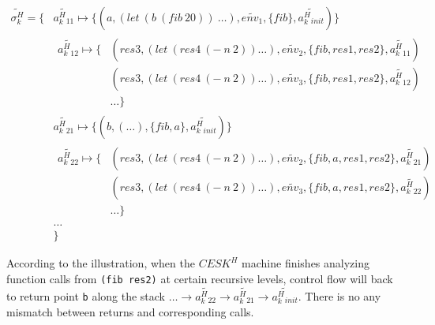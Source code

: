 \documentclass{article}
\begin{document}
\[
\begin{aligned}
\widetilde{\sigma_k^H} = \{ {}& \widetilde{a^H_k{}_{11}} \mapsto \{(a, (let\ (b\ (fib\ 20))\ \dots), \widetilde{env_1}, \{fib\}, \widetilde{a^H_k{}_{init}})\}  {} \\
                            &
                            \begin{aligned}
                              \widetilde{a^H_k{}_{12}} \mapsto
                              \{{}& (res3, (let\ (res4\ (-\ n\ 2)) \dots), \widetilde{env_2}, \{fib, res1, res2\}, \widetilde{a^H_k{}_{11}}) {}\\
                              & (res3, (let\ (res4\ (-\ n\ 2)) \dots), \widetilde{env_3}, \{fib, res1, res2\}, \widetilde{a^H_k{}_{12}}) {} \\
                              & \dots
                              \}
                            \end{aligned} {} \\
                            & \widetilde{a^H_k{}_{21}} \mapsto \{(b, (\dots), \{fib, a\}, \widetilde{a^H_k{}_{init}}) \} {}\\
                            &
                            \begin{aligned}
                              \widetilde{a^H_k{}_{22}} \mapsto
                              \{{}& (res3, (let\ (res4\ (-\ n\ 2)) \dots), \widetilde{env_2}, \{fib, a, res1, res2\}, \widetilde{a^H_k{}_{21}}) {}\\
                              & (res3, (let\ (res4\ (-\ n\ 2)) \dots), \widetilde{env_3}, \{fib, a, res1, res2\}, \widetilde{a^H_k{}_{22}}) {} \\
                              & \dots
                              \}
                            \end{aligned} {}\\
                            & \dots {}\\
                            & \}
\end{aligned}
\]

According to the illustration, when the $CESK^H$ machine finishes analyzing function calls from \verb|(fib res2)| at certain recursive levels, control flow will back to return point \verb|b| along the stack $\dots \to \widetilde{a^H_k{}_{22}} \to \widetilde{a^H_k{}_{21}} \to \widetilde{a^H_k{}_{init}}$. There is no any mismatch between returns and corresponding calls.
\end{document}
